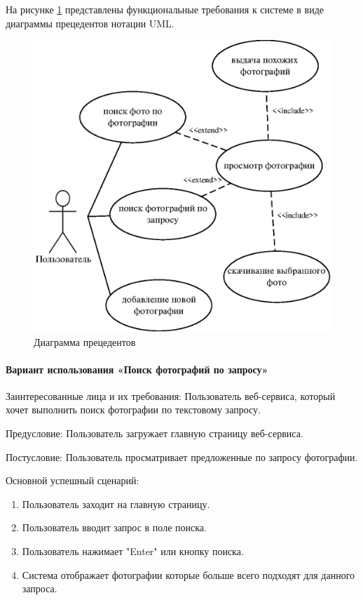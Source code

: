 На рисунке \ref{fig:-use_case_diagram} представлены функциональные требования к системе в виде диаграммы прецедентов нотации UML.
\begin{figure}
	\centering
	\includegraphics[width=0.9\linewidth]{"images/Прецеденты"}
	\caption{Диаграмма прецедентов}
	\label{fig:-use_case_diagram}
\end{figure}

\paragraph{Вариант использования «Поиск фотографий по запросу»}
Заинтересованные лица и их требования: Пользователь веб-сервиса, который хочет выполнить поиск фотографии по текстовому запросу.

Предусловие: Пользователь загружает главную страницу веб-сервиса.

Постусловие: Пользователь просматривает предложенные по запросу фотографии.

Основной успешный сценарий:
\begin{enumerate}
	\item Пользователь заходит на главную страницу.
	\item Пользователь вводит запрос в поле поиска.
	\item Пользователь нажимает "Enter" или кнопку поиска.
	\item Система отображает фотографии которые больше всего подходят для данного запроса.
\end{enumerate}

